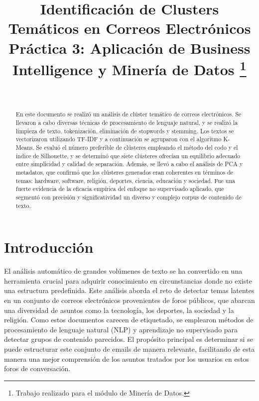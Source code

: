 \documentclass[journal]{IEEEtran}
\begin{document}
\title{Identificación de Clusters Temáticos en Correos Electrónicos\\
{\footnotesize Práctica 3: Aplicación de Business Intelligence y Minería de Datos}
\thanks{Trabajo realizado para el módulo de Minería de Datos.}
}

\author{
    \\
}

\maketitle

\renewcommand{\abstractname}{Resumen}
\begin{abstract}
En este documento se realizó un análisis de clúster temático de correos electrónicos. Se llevaron a cabo diversas técnicas de procesamiento de lenguaje natural, y se realizó la limpieza de texto, tokenización, eliminación de stopwords y stemming. Los textos se vectorizaron utilizando TF-IDF y a continuación se agruparon con el algoritmo K-Means. Se evaluó el número preferible de clústeres empleando el método del codo y el índice de Silhouette, y se determinó que siete clústeres ofrecían un equilibrio adecuado entre simplicidad y calidad de separación. Además, se llevó a cabo el análisis de PCA y metadatos, que confirmó que los clústeres generados eran coherentes en términos de temas: hardware, software, religión, deportes, ciencia, educación y sociedad. Fue una fuerte evidencia de la eficacia empírica del enfoque no supervisado aplicado, que segmentó con precisión y significatividad un diverso y complejo corpus de contenido de texto.
\end{abstract}

\section{Introducción}
El análisis automático de grandes volúmenes de texto se ha convertido en una herramienta crucial para adquirir conocimiento en circunstancias donde no existe una estructura predefinida.  Este análisis aborda el reto de detectar temas latentes en un conjunto de correos electrónicos provenientes de foros públicos, que abarcan una diversidad de asuntos como la tecnología, los deportes, la sociedad y la religión.   Como estos documentos carecen de etiquetado, se emplearon métodos de procesamiento de lenguaje natural (NLP) y aprendizaje no supervisado para detectar grupos de contenido parecidos.  El propósito principal es determinar si se puede estructurar este conjunto de emails de manera relevante, facilitando de esta manera una mejor comprensión de los asuntos tratados por los usuarios en estos foros de conversación.
\end{document}
